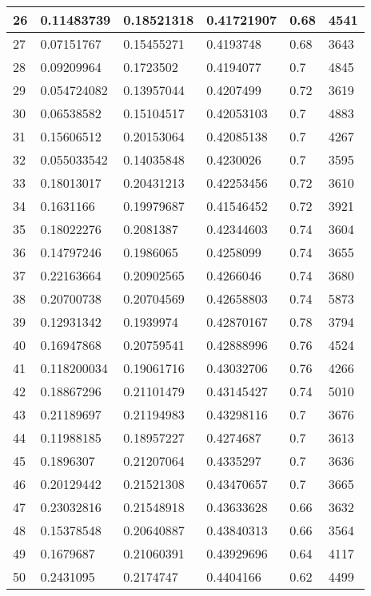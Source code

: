 \begin{longtable}{|l|l|l|l|l|l|}
26 & 0.11483739 & 0.18521318 & 0.41721907 & 0.68 & 4541 \\ \hline 
27 & 0.07151767 & 0.15455271 & 0.4193748 & 0.68 & 3643 \\ \hline 
28 & 0.09209964 & 0.1723502 & 0.4194077 & 0.7 & 4845 \\ \hline 
29 & 0.054724082 & 0.13957044 & 0.4207499 & 0.72 & 3619 \\ \hline 
30 & 0.06538582 & 0.15104517 & 0.42053103 & 0.7 & 4883 \\ \hline 
31 & 0.15606512 & 0.20153064 & 0.42085138 & 0.7 & 4267 \\ \hline 
32 & 0.055033542 & 0.14035848 & 0.4230026 & 0.7 & 3595 \\ \hline 
33 & 0.18013017 & 0.20431213 & 0.42253456 & 0.72 & 3610 \\ \hline 
34 & 0.1631166 & 0.19979687 & 0.41546452 & 0.72 & 3921 \\ \hline 
35 & 0.18022276 & 0.2081387 & 0.42344603 & 0.74 & 3604 \\ \hline 
36 & 0.14797246 & 0.1986065 & 0.4258099 & 0.74 & 3655 \\ \hline 
37 & 0.22163664 & 0.20902565 & 0.4266046 & 0.74 & 3680 \\ \hline 
38 & 0.20700738 & 0.20704569 & 0.42658803 & 0.74 & 5873 \\ \hline 
39 & 0.12931342 & 0.1939974 & 0.42870167 & 0.78 & 3794 \\ \hline 
40 & 0.16947868 & 0.20759541 & 0.42888996 & 0.76 & 4524 \\ \hline 
41 & 0.118200034 & 0.19061716 & 0.43032706 & 0.76 & 4266 \\ \hline 
42 & 0.18867296 & 0.21101479 & 0.43145427 & 0.74 & 5010 \\ \hline 
43 & 0.21189697 & 0.21194983 & 0.43298116 & 0.7 & 3676 \\ \hline 
44 & 0.11988185 & 0.18957227 & 0.4274687 & 0.7 & 3613 \\ \hline 
45 & 0.1896307 & 0.21207064 & 0.4335297 & 0.7 & 3636 \\ \hline 
46 & 0.20129442 & 0.21521308 & 0.43470657 & 0.7 & 3665 \\ \hline 
47 & 0.23032816 & 0.21548918 & 0.43633628 & 0.66 & 3632 \\ \hline 
48 & 0.15378548 & 0.20640887 & 0.43840313 & 0.66 & 3564 \\ \hline 
49 & 0.1679687 & 0.21060391 & 0.43929696 & 0.64 & 4117 \\ \hline 
50 & 0.2431095 & 0.2174747 & 0.4404166 & 0.62 & 4499 \\ \hline 
\end{longtable}